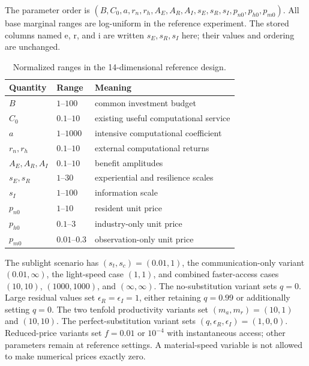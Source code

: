 The parameter order is $(B,C_0,a,r_n,r_h,A_E,A_R,A_I,s_E,s_R,s_I,p_{n0},p_{h0},p_{m0})$. All base marginal ranges are log-uniform in the reference experiment. The stored columns named e, r, and i are written $s_E,s_R,s_I$ here; their values and ordering are unchanged.

\begin{table}[htbp]
\centering
\caption{Normalized ranges in the 14-dimensional reference design.}
\label{tab:ranges}
\begin{tabular}{@{}lll@{}}
\toprule
Quantity & Range & Meaning\\
\midrule
$B$ & $1$--$100$ & common investment budget\\
$C_0$ & $0.1$--$10$ & existing useful computational service\\
$a$ & $1$--$1000$ & intensive computational coefficient\\
$r_n,r_h$ & $0.1$--$10$ & external computational returns\\
$A_E,A_R,A_I$ & $0.1$--$10$ & benefit amplitudes\\
$s_E,s_R$ & $1$--$30$ & experiential and resilience scales\\
$s_I$ & $1$--$100$ & information scale\\
$p_{n0}$ & $1$--$10$ & resident unit price\\
$p_{h0}$ & $0.1$--$3$ & industry-only unit price\\
$p_{m0}$ & $0.01$--$0.3$ & observation-only unit price\\
\bottomrule
\end{tabular}
\end{table}

The sublight scenario has $(s_t,s_c)=(0.01,1)$, the communication-only variant $(0.01,\infty)$, the light-speed case $(1,1)$, and combined faster-access cases $(10,10)$, $(1000,1000)$, and $(\infty,\infty)$. The no-substitution variant sets $q=0$. Large residual values set $\epsilon_R=\epsilon_I=1$, either retaining $q=0.99$ or additionally setting $q=0$. The two tenfold productivity variants set $(m_a,m_r)=(10,1)$ and $(10,10)$. The perfect-substitution variant sets $(q,\epsilon_R,\epsilon_I)=(1,0,0)$. Reduced-price variants set $f=0.01$ or $10^{-4}$ with instantaneous access; other parameters remain at reference settings. A material-speed variable is not allowed to make numerical prices exactly zero.

